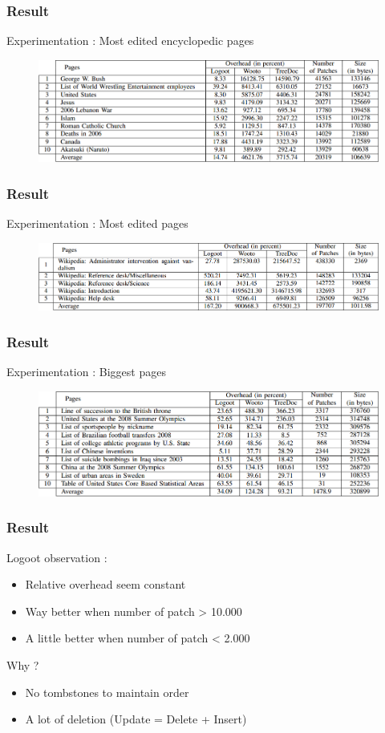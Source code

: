 \documentclass[14pt]{beamer}
\begin{document}
	\begin{frame}
		\frametitle{Result}
			Experimentation : Most edited encyclopedic pages
			\begin{figure}
				\includegraphics[width=1\textwidth]{includes/etu1}
			\end{figure}
	\end{frame}

	\begin{frame}
		\frametitle{Result}
			Experimentation : Most edited pages
			\begin{figure}
				\includegraphics[width=1\textwidth]{includes/etu2}
			\end{figure}
	\end{frame}

	\begin{frame}
		\frametitle{Result}
			Experimentation : Biggest pages
			\begin{figure}
				\includegraphics[width=1\textwidth]{includes/etu3}
			\end{figure}
	\end{frame}

	\begin{frame}
		\frametitle{Result}
			Logoot observation :
			\begin{itemize}
				\item Relative overhead seem constant
				\item Way better when number of patch > 10.000 
				\item A little better when number of patch < 2.000
			\end{itemize}
			Why ?
			\begin{itemize}
				\item No tombstones to maintain order
				\item A lot of deletion (Update = Delete + Insert)
			\end{itemize}
	\end{frame}
\end{document}
